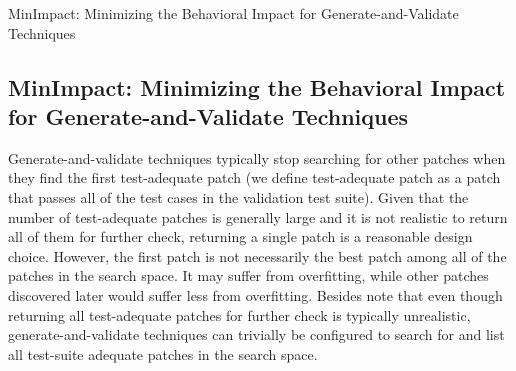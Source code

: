 \documentclass[]{sig-alternate}
\begin{document}
\begin{algorithm}[t]
\begin{algorithmic}[1]
        \ENDFOR
    
    \ENDFOR
        \ENDIF
    \ENDFOR
\ENDIF
{}
\end{algorithmic}
\caption{MinImpact: Minimizing the Behavioral Impact for Generate-and-Validate Techniques}
\label{alg:1}
\end{algorithm}




\subsection{MinImpact: Minimizing the Behavioral Impact for Generate-and-Validate Techniques}


Generate-and-validate techniques typically stop searching for other patches when they find the first test-adequate patch (we define test-adequate patch as a patch that passes all of the test cases in the validation test suite). Given that the number of test-adequate patches is generally large \cite{Long:2016:ASS:2884781.2884872} and it is not realistic to return all of them for further check, returning a single patch is a reasonable design choice. However, the first patch is not necessarily the best patch among all of the patches in the search space. It may suffer from overfitting, while other patches discovered later would suffer less from overfitting.
Besides note that even though returning all test-adequate patches for further check is typically unrealistic, generate-and-validate techniques can trivially be configured to search for and list all test-suite adequate patches in the search space.   
\end{document}
